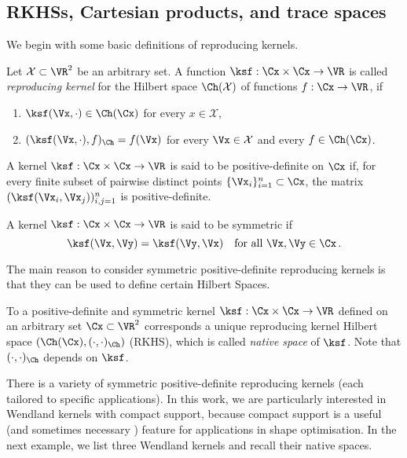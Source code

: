 \documentclass{siamart1116}
\numberwithin{theorem}{section}
\begin{document}
\subsection{RKHSs, Cartesian products, and trace spaces}
We begin with some basic definitions of reproducing kernels.
\begin{definition}
	Let $\mathcal X\subset \VR^2$ be an arbitrary set. A function 
	$\ksf:\mathcal \Cx\times\Cx\to \VR$ is called 
	\emph{reproducing kernel} for the Hilbert space 
	$\Ch(\mathcal X)$ of functions $f:\Cx\to \VR$, if
	\begin{enumerate}[$(a)$]
		\item 
		$\ksf(\Vx,\cdot)\in \Ch(\Cx)$ for every $x\in \mathcal X$,
		\item
		$(\ksf(\Vx,\cdot), f)_{\Ch} = f(\Vx)	$ for every $\Vx\in \mathcal X$ and every $f\in \Ch(\Cx)$.
	\end{enumerate}
\end{definition}

\begin{definition}
	A kernel $\ksf:\Cx\times \Cx\to \VR$ is said to be positive-definite on $\Cx$ if,
	for every finite subset of pairwise distinct points $\{\Vx_i\}_{i=1}^n\subset\Cx$,
	the matrix 	$(\ksf(\Vx_i,\Vx_j))_{i,j=1}^{n}$ is positive-definite.
\end{definition}

\begin{definition}
	A kernel $\ksf:\Cx\times \Cx\to \VR$ is said to be symmetric if
	\begin{equation*} \ksf(\Vx, \Vy) = \ksf(\Vy, \Vx)  \quad \text{for all } \Vx, \Vy \in \Cx\,.\end{equation*}
\end{definition}

The main reason to consider symmetric positive-definite reproducing kernels is that they
can be used to define certain Hilbert Spaces.

\begin{theorem}
To a positive-definite and symmetric kernel $\ksf:\Cx\times \Cx \to \VR$ defined on an arbitrary set
$\Cx\subset \VR^2$ corresponds a unique reproducing kernel Hilbert space  $(\Ch(\Cx),(\cdot,\cdot)_{\Ch})$ (RKHS),
which is called \emph{native space} of $\ksf$. Note that $(\cdot,\cdot)_{\Ch}$ depends on $\ksf$. 
\end{theorem}

There is a variety of symmetric positive-definite reproducing kernels \cite{Wendlandbook}
(each tailored to specific applications).
In this work, we are particularly interested in Wendland kernels with compact support,
because compact support is a useful (and sometimes necessary \cite{LaSt16}) feature for
applications in shape optimisation.
In the next example, we list three Wendland kernels and recall their native spaces.
\end{document}

